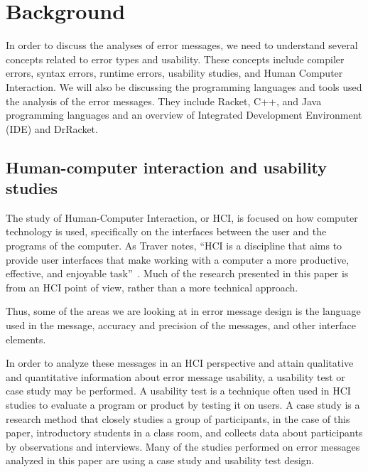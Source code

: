 \documentclass{sig-alternate}
\begin{document}


\section{Background}\label{background}
In order to discuss the analyses of error messages, we need to understand several concepts related to error types and usability.
These concepts include compiler errors, syntax errors, runtime errors, usability studies, and Human Computer Interaction.
We will also be discussing the programming languages and tools used the analysis of the error messages.
They include Racket, C++, and Java programming languages and an overview of Integrated Development Environment (IDE) and DrRacket. 


\subsection{Human-computer interaction and usability studies}

The study of Human-Computer Interaction, or HCI, is focused on how computer technology is used, specifically on the interfaces between the user and the programs of the computer.
As Traver notes, ``HCI is a discipline that aims to provide user interfaces that make working with a computer a more productive, effective, and enjoyable task''~\cite{Traver:2010}.
Much of the research presented in this paper is from an HCI point of view, rather than a more technical approach.

Thus, some of the areas we are looking at in error message design is the language used in the message, accuracy and precision of the messages, and other interface elements.



In order to analyze these messages in an HCI perspective and attain qualitative and quantitative information about error message usability, a usability test or case study may be performed.
A usability test is a technique often used in HCI studies to evaluate a program or product by testing it on users.
A case study is a research method that closely studies a group of participants, in the case of this paper, introductory students in a class room, and collects data about participants by observations and interviews.
Many of the studies performed on error messages analyzed in this paper are using a case study and usability test design. 
\end{document}
